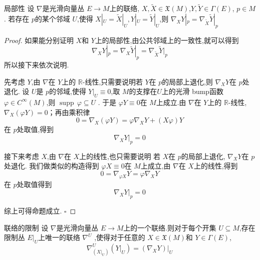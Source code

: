 \documentclass[../../几何与拓扑.tex]{subfiles}
\begin{document}
\begin{lemma}{局部性}
    设 \(  \nabla   \)是光滑向量丛 \(  E\to M  \)上的联络, \(  X,\tilde{X}\in \mathfrak{X}\left( M \right)   \),\(  Y,\tilde{Y} \in  \Gamma \left( E \right)   \), \(  p \in M  \) .
    若存在 \(  p  \)的某个邻域 \(  U  \),使得 \(  X|_{U} =  \tilde{X}|_{U}, Y|_{U} =  \tilde{Y}|_{U}    \),则 \(  \nabla _{X} Y|_{p}=  \nabla _{\tilde{X}}\tilde{Y}|_{p}  \)         
\end{lemma}
\begin{proof}
    如果能分别证明  \(  X  \)和 \(  Y  \)上的局部性,由公共邻域上的一致性,就可以得到 \[
    \nabla _{X} Y|_{p} =  \nabla _{X} \tilde{Y}|_{p} =  \nabla _{\tilde{X}} \tilde{Y}|_{p}
    \]  所以接下来依次说明.

    先考虑 \(  Y  \),由 \(  \nabla   \)在 \(  Y  \)上的 \(  \mathbb{R}   \)-线性,只需要说明若 \(  Y  \)在 \(  p  \)的局部上退化,则 \(  \nabla _{X} Y  \)在 \(  p  \)处退化.
    设 \(  U  \)是 \(  p  \)的邻域,使得 \(  Y|_{U} \equiv 0  \),取 \(  M  \)的支撑在\(  U  \)上的光滑 bump函数 \(   \varphi  \in C^{\infty}\left( M \right)   \),则 \(  \operatorname{supp}\, \varphi \subseteq  U  \) .
    于是 \(   \varphi Y \equiv 0  \)在 \(  M  \)上成立.由 \(  \nabla   \)在 \(  Y  \)上的 \(  \mathbb{R}   \)-线性, \(  \nabla _{X}\left(  \varphi Y \right)= 0   \)；再由乘积律 \[
    0 =  \nabla _{X} \left(  \varphi Y \right) =  \varphi  \nabla _{X}Y+ \left( X \varphi  \right)Y   
    \]  在 \(  p  \)处取值,得到 \[
     \nabla _{X}Y|_{p} =  0
    \] 

    接下来考虑 \(  X  \),由 \(  \nabla   \)在 \(  X  \)上的线性,也只需要说明 若 \(  X  \)在 \(  p  \)的局部上退化, \(  \nabla _{X}Y  \)在 \(  p  \)处退化.
    我们做类似的构造得到 \(   \varphi X \equiv 0  \)在 \(  M  \)上成立,由 \(  \nabla   \)在 \(  X  \)上的线性,得到 \[
    0 =  \nabla _{ \varphi X}Y =   \varphi  \nabla _{X}Y
    \]在 \(  p  \)处取值得到 \[
    \nabla _{X} Y|_{p}= 0
    \]
    
    
    综上可得命题成立.
    \hfill $\square$
\end{proof}
\begin{proposition}{联络的限制}
    设 \(  \nabla   \)是光滑向量丛 \(  E \to M  \)上的一个联络.则对于每个开集 \(  U\subseteq M  \),存在限制丛 \(  E|_{U}  \)上唯一的联络 \(  \nabla ^{U}    \) ,使得对于任意的 \(  X \in \mathfrak{X}\left( M \right)   \)和 \(  Y \in  \Gamma \left( E \right)   \), \[
     \nabla  ^{U}_{\left( X|_{U} \right) }\left( Y|_{U} \right) =  \left. \left(  \nabla  _{X}Y \right)  \right|_{U}
    \]      
    
\end{proposition}
\end{document}
